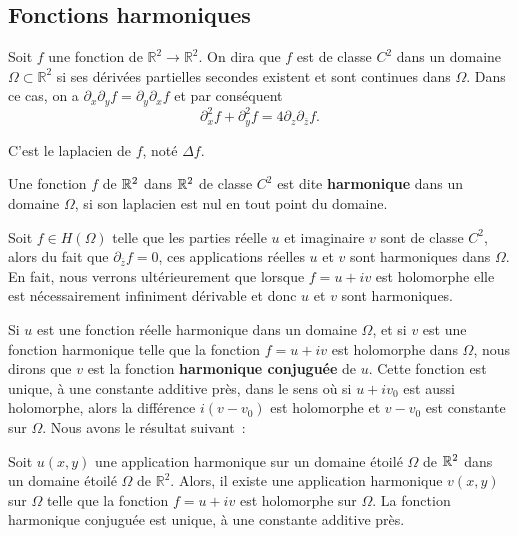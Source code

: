 \subsection{Fonctions harmoniques}

Soit $f$ une fonction de $\mathbb{R}^2 \to \mathbb{R}^2$. On dira que
$f$ est de classe $C^2$ dans un domaine $\Omega \subset \mathbb{R}^2$
si ses dérivées partielles secondes existent et sont continues dans
$\Omega$. Dans ce cas, on a $\partial_x \partial_y f= \partial_y \partial_x f$ et par conséquent
\[\partial_x^2 f + \partial_y^2 f=4 \partial_z  \partial_{\bar{z}}f.\]

C'est le laplacien de $f$, noté $\Delta f$. 

\begin{defn}
Une fonction $f$ de $\mathbb R^2$ dans $\mathbb R^2$ de classe $C^2$ est dite \textbf{harmonique} dans un domaine $\Omega$, si son laplacien est nul en tout point du domaine. 
\end{defn}

Soit $f \in H(\Omega)$ telle que les parties
réelle $u$ et imaginaire $v$ sont de classe $C^2$, alors du fait que $\partial_{\overline{z}} f =0$, ces applications réelles $u$ et $v$ sont harmoniques dans $\Omega$. En fait, nous verrons ultérieurement que lorsque $f=u + iv$ est holomorphe elle est nécessairement infiniment dérivable et donc $u$ et $v$ sont harmoniques. 

Si $u$ est une fonction réelle harmonique dans un domaine $\Omega$, et si $v$ est une fonction harmonique telle que la fonction $f=u + iv$ est holomorphe dans $\Omega$, nous dirons que $v$ est la fonction \textbf{harmonique conjuguée} de $u$. Cette fonction est unique, à une constante additive près, dans le sens où si $u + i v_0$ est aussi holomorphe, alors la différence $i(v-v_0)$ est holomorphe et $v-v_0$ est constante sur $\Omega$. Nous avons le résultat suivant~:   

\begin{theorem}
Soit $u(x,y)$ une application harmonique sur un domaine étoilé $\Omega$ de $\mathbb R^2$ dans un domaine étoilé $\Omega$ de $\mathbb{R}^2$. Alors, il existe une application harmonique $v(x,y)$ sur $\Omega$ telle que la fonction $f=u + iv$ est holomorphe sur $\Omega$. La fonction harmonique conjuguée est unique, à une constante additive près.   
\end{theorem}

